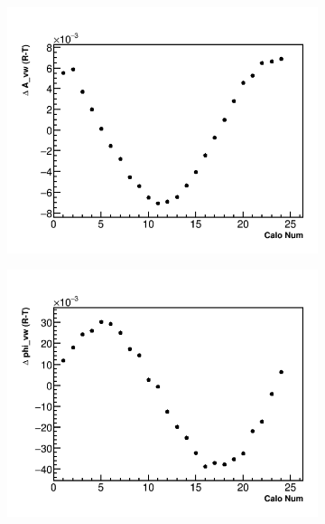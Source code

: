 \documentclass[12pt,letterpaper]{article}
\begin{document}
\begin{figure}[]
    \begin{subfigure}[t]{0.45\textwidth}
        \centering
        \includegraphics[width=\textwidth]{JamesMC_Avw_Diff}
        \caption{}
    \end{subfigure}%
    \begin{subfigure}[t]{0.45\textwidth}
        \centering
        \includegraphics[width=\textwidth]{JamesMC_Phivw_Diff}
        \caption{}
    \end{subfigure}
\caption[]{}
\label{}
\end{figure}
\end{document}
